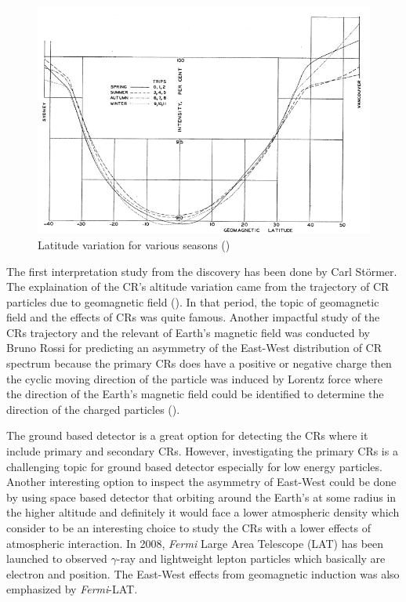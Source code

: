 \begin{figure}[h!]
    \centering
    \includegraphics[width=\textwidth]{content/background/figures/compton_sail_1937.png}
    \caption{Latitude variation for various seasons (\cite{compton1937cosmic})}
    \label{fig:comptonship}
\end{figure}
	
The first interpretation study from the discovery has been
done by Carl Störmer. The explaination of the CR's altitude variation
came from the trajectory of CR particles due to geomagnetic field
(\cite{stormer1934critical}). In that period, the topic of 
geomagnetic field and the effects of CRs was quite famous.
Another impactful study of the CRs trajectory and the relevant
of Earth's magnetic field was conducted by Bruno Rossi
for predicting an asymmetry of the East-West distribution
of CR spectrum because the primary CRs does have a positive or
negative charge then the cyclic moving direction of the 
particle was induced by Lorentz force where the direction of 
the Earth's magnetic field could be identified to determine the
direction of the charged particles (\cite{rossi1941cosmic}).

The ground based detector is a great option for 
detecting the CRs where it include primary and secondary CRs.
However, investigating the primary CRs is a challenging topic
for ground based detector especially for low energy particles.
Another interesting option to inspect the asymmetry of 
East-West could be done by using space based detector 
that orbiting around the Earth's at some radius in the
higher altitude and definitely it would face a lower 
atmospheric density which consider to be an interesting 
choice to study the CRs with a lower effects of atmospheric
interaction. In 2008, \textit{Fermi} Large Area Telescope (LAT)
has been launched to observed $\gamma$-ray and
lightweight lepton particles which basically are electron
and position. The East-West effects from geomagnetic
induction was also emphasized by \textit{Fermi}-LAT.


